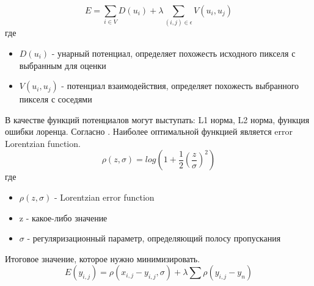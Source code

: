 \begin{equation}
E = \sum_{i\in V}D(u_i) + \lambda\sum_{(i,j)\in\epsilon}V(u_i,u_j)
\end{equation}
где
\begin{itemize}
	\item $D(u_i)$ - унарный потенциал, определяет похожесть исходного пикселя с выбранным для оценки
	\item $V(u_i,u_j)$ - потенциал взаимодействия, определяет похожесть выбранного пикселя с соседями
\end{itemize}

В качестве функций потенциалов могут выступать: L1 норма, L2 норма, функция ошибки лоренца. 
Согласно \cite{}. Наиболее оптимальной функцией является error Lorentzian function. 
\begin{equation}\label{eq:mr:l}
	\rho(z,\sigma) = log(1 + \frac{1}{2}(\frac{z}{\sigma})^2)
\end{equation}
где
\begin{itemize}
	\item $\rho(z,\sigma)$ - Lorentzian error function
	\item z - какое-либо значение
	\item $\sigma$ - регуляризационный параметр, определяющий полосу пропускания
\end{itemize}

Итоговое значение, которое нужно минимизировать.
\begin{equation}
	E(y_{i,j})= \rho(x_{i,j} - y_{i,j}, \sigma) + \lambda\sum \rho(y_{i,j}-y_n)
\end{equation}
